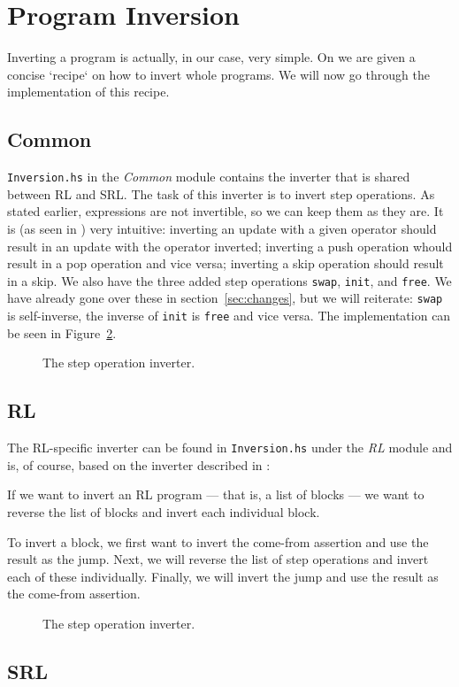 \section{Program Inversion}

Inverting a program is actually, in our case, very simple. On \cite[p.~104]{REV} we are given a concise `recipe` on how to invert whole programs. We will now go through the implementation of this recipe.

\subsection{Common}

\texttt{Inversion.hs} in the \textit{Common} module contains the inverter that is shared between RL and SRL. The task of this inverter is to invert step operations. As stated earlier, expressions are not invertible, so we can keep them as they are. It is (as seen in \cite[Fig.~20]{REV}) very intuitive: inverting an update with a given operator should result in an update with the operator inverted; inverting a push operation whould result in a pop operation and vice versa; inverting a skip operation should result in a skip. We also have the three added step operations \texttt{swap}, \texttt{init}, and \texttt{free}. We have already gone over these in section~\ref{sec:changes}, but we will reiterate: \texttt{swap} is self-inverse, the inverse of \texttt{init} is \texttt{free} and vice versa. The implementation can be seen in Figure~\ref{fig:commoninvert}.

\begin{figure}[H]
  
  \caption{The step operation inverter.}\label{fig:commoninvert}
\end{figure}

\subsection{RL}

The RL-specific inverter can be found in \texttt{Inversion.hs} under the \textit{RL} module and is, of course, based on the inverter described in \cite[Fig.~19]{REV}:

If we want to invert an RL program --- that is, a list of blocks --- we want to reverse the list of blocks and invert each individual block.

To invert a block, we first want to invert the come-from assertion and use the result as the jump. Next, we will reverse the list of step operations and invert each of these individually. Finally, we will invert the jump and use the result as the come-from assertion.

\begin{figure}[H]
  
  \caption{The step operation inverter.}\label{fig:commoninvert}
\end{figure}

\subsection{SRL}
